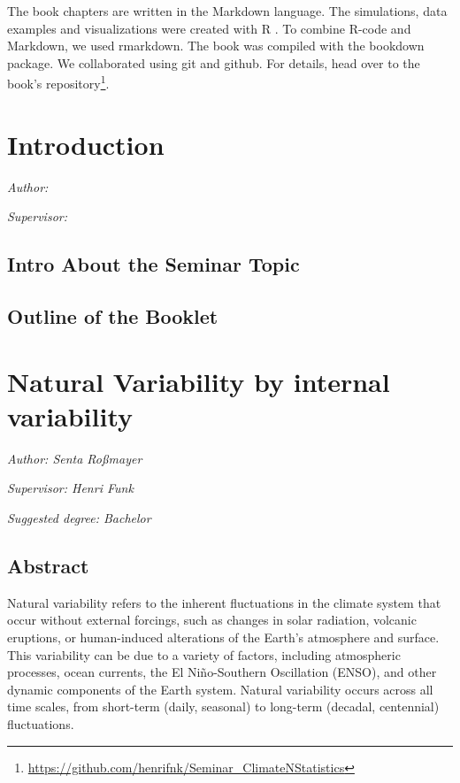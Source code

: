 \documentclass[
]{krantz}
\renewcommand{\href}[2]{#2\footnote{\url{#1}}}
\begin{document}
The book chapters are written in the Markdown language.
The simulations, data examples and visualizations were created with R \citep{rlang}.
To combine R-code and Markdown, we used rmarkdown.
The book was compiled with the bookdown package.
We collaborated using git and github.
For details, head over to the \href{https://github.com/henrifnk/Seminar_ClimateNStatistics}{book's repository}.

\chapter{Introduction}\label{introduction}

\emph{Author: }

\emph{Supervisor: }

\section{Intro About the Seminar Topic}\label{intro-about-the-seminar-topic}

\section{Outline of the Booklet}\label{outline-of-the-booklet}

\chapter{Natural Variability by internal variability}\label{iv}

\emph{Author: Senta Roßmayer}

\emph{Supervisor: Henri Funk}

\emph{Suggested degree: Bachelor}

\section{Abstract}\label{abstract}

Natural variability refers to the inherent fluctuations in the climate system that occur without external forcings, such as changes in solar radiation, volcanic eruptions, or human-induced alterations of the Earth's atmosphere and surface. This variability can be due to a variety of factors, including atmospheric processes, ocean currents, the El Niño-Southern Oscillation (ENSO), and other dynamic components of the Earth system. Natural variability occurs across all time scales, from short-term (daily, seasonal) to long-term (decadal, centennial) fluctuations.
\end{document}
